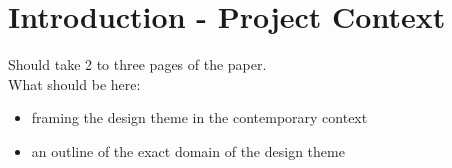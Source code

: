 \chapter{Introduction - Project Context}\label{ch:context}
\pagestyle{fancy}

{\color{blue}\noindent Should take 2 to three pages of the paper.\\}
\noindent What should be here:

\begin{itemize}
	\item framing the design theme in the contemporary context
	\item an outline of the exact domain of the design theme
\end{itemize}




